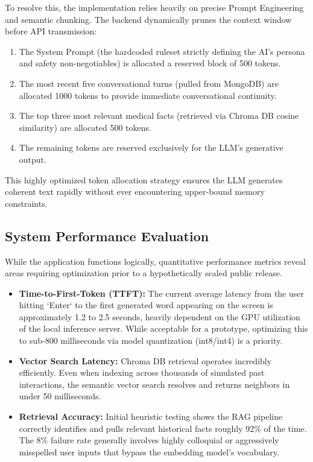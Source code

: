 \documentclass[12pt]{article}
\begin{document}
To resolve this, the implementation relies heavily on precise Prompt Engineering and semantic chunking. The backend dynamically prunes the context window before API transmission:
\begin{enumerate}
    \item The System Prompt (the hardcoded ruleset strictly defining the AI's persona and safety non-negotiables) is allocated a reserved block of 500 tokens. 
    \item The most recent five conversational turns (pulled from MongoDB) are allocated 1000 tokens to provide immediate conversational continuity.
    \item The top three most relevant medical facts (retrieved via Chroma DB cosine similarity) are allocated 500 tokens.
    \item The remaining tokens are reserved exclusively for the LLM's generative output.
\end{enumerate}
This highly optimized token allocation strategy ensures the LLM generates coherent text rapidly without ever encountering upper-bound memory constraints.

\subsection{System Performance Evaluation}
While the application functions logically, quantitative performance metrics reveal areas requiring optimization prior to a hypothetically scaled public release.
\begin{itemize}
    \item \textbf{Time-to-First-Token (TTFT):} The current average latency from the user hitting `Enter` to the first generated word appearing on the screen is approximately 1.2 to 2.5 seconds, heavily dependent on the GPU utilization of the local inference server. While acceptable for a prototype, optimizing this to sub-800 milliseconds via model quantization (int8/int4) is a priority.
    \item \textbf{Vector Search Latency:} Chroma DB retrieval operates incredibly efficiently. Even when indexing across thousands of simulated past interactions, the semantic vector search resolves and returns neighbors in under 50 milliseconds.
    \item \textbf{Retrieval Accuracy:} Initial heuristic testing shows the RAG pipeline correctly identifies and pulls relevant historical facts roughly 92\% of the time. The 8\% failure rate generally involves highly colloquial or aggressively misspelled user inputs that bypass the embedding model's vocabulary.
\end{itemize}
\end{document}
